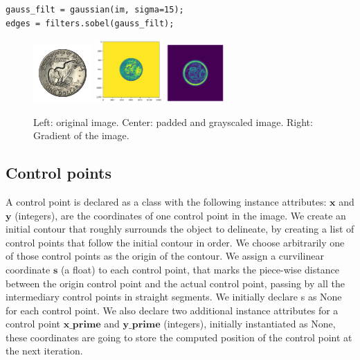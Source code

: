\documentclass[24pt]{article}
\begin{document}
\begin{lstlisting}
gauss_filt = gaussian(im, sigma=15);
edges = filters.sobel(gauss_filt);
\end{lstlisting}


\begin{figure}[h!]
  \centering
  \includegraphics[width=0.2\textwidth]{Dollar.jpg}
  \includegraphics[width=0.23\textwidth]{coin.png}
  \includegraphics[width=0.20\textwidth]{grad.png}
  \caption{Left: original image. Center: padded and grayscaled image. Right: Gradient of the image.  }
  \label{fig:image_and_grad}
\end{figure}




\subsection{Control points}

A control point is declared as a class with the following instance attributes: $\textbf{x}$ and $\textbf{y}$ (integers), are the coordinates of one control point in the image. We create an initial contour that roughly surrounds the object to delineate, by creating a list of control points that follow the initial contour in order. We choose arbitrarily one of those control points as the origin of the contour. We assign a curvilinear coordinate  $\textbf{s}$ (a float) to each control point, that marks the piece-wise distance between the origin control point and the actual control point, passing by all the intermediary control points in straight segments. We initially declare s as None for each control point. We also declare two additional instance attributes for a control point  $\textbf{x\_prime}$ and $\textbf{y\_prime}$ (integers), initially instantiated as None, these coordinates are going to store the computed position of the control point at the next iteration. 
\end{document}
